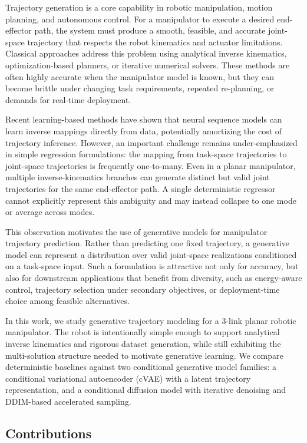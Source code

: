 \documentclass[11pt]{article}
\begin{document}
Trajectory generation is a core capability in robotic manipulation, motion planning, and autonomous control. For a manipulator to execute a desired end-effector path, the system must produce a smooth, feasible, and accurate joint-space trajectory that respects the robot kinematics and actuator limitations. Classical approaches address this problem using analytical inverse kinematics, optimization-based planners, or iterative numerical solvers. These methods are often highly accurate when the manipulator model is known, but they can become brittle under changing task requirements, repeated re-planning, or demands for real-time deployment.

Recent learning-based methods have shown that neural sequence models can learn inverse mappings directly from data, potentially amortizing the cost of trajectory inference. However, an important challenge remains under-emphasized in simple regression formulations: the mapping from task-space trajectories to joint-space trajectories is frequently one-to-many. Even in a planar manipulator, multiple inverse-kinematics branches can generate distinct but valid joint trajectories for the same end-effector path. A single deterministic regressor cannot explicitly represent this ambiguity and may instead collapse to one mode or average across modes.

This observation motivates the use of generative models for manipulator trajectory prediction. Rather than predicting one fixed trajectory, a generative model can represent a distribution over valid joint-space realizations conditioned on a task-space input. Such a formulation is attractive not only for accuracy, but also for downstream applications that benefit from diversity, such as energy-aware control, trajectory selection under secondary objectives, or deployment-time choice among feasible alternatives.

In this work, we study generative trajectory modeling for a 3-link planar robotic manipulator. The robot is intentionally simple enough to support analytical inverse kinematics and rigorous dataset generation, while still exhibiting the multi-solution structure needed to motivate generative learning. We compare deterministic baselines against two conditional generative model families: a conditional variational autoencoder (cVAE) with a latent trajectory representation, and a conditional diffusion model with iterative denoising and DDIM-based accelerated sampling.

\subsection*{Contributions}
\end{document}
